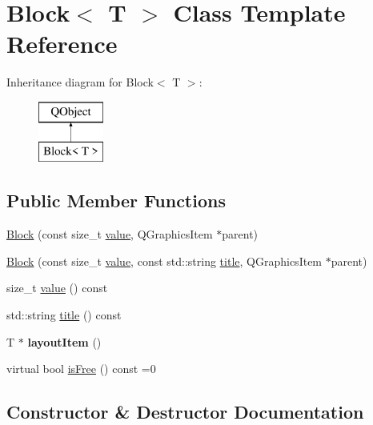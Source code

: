 \hypertarget{class_block}{}\section{Block$<$ T $>$ Class Template Reference}
\label{class_block}
Inheritance diagram for Block$<$ T $>$\+:\begin{figure}[H]
\begin{center}
\leavevmode
\includegraphics[height=2.000000cm]{class_block}
\end{center}
\end{figure}
\subsection*{Public Member Functions}
\begin{DoxyCompactItemize}
\item 
\mbox{\hyperlink{class_block_aa19ca9a93a3cb69f9583c1f5edfd5d26}{Block}} (const size\+\_\+t \mbox{\hyperlink{class_block_ab0b547f273f8d5e4e783ccedaf13ef26}{value}}, Q\+Graphics\+Item $\ast$parent)
\item 
\mbox{\hyperlink{class_block_a91743e5381dcc23971f99db3f1b7607c}{Block}} (const size\+\_\+t \mbox{\hyperlink{class_block_ab0b547f273f8d5e4e783ccedaf13ef26}{value}}, const std\+::string \mbox{\hyperlink{class_block_a48197972162fbfe6b2f4d721d80034cf}{title}}, Q\+Graphics\+Item $\ast$parent)
\item 
size\+\_\+t \mbox{\hyperlink{class_block_ab0b547f273f8d5e4e783ccedaf13ef26}{value}} () const
\item 
std\+::string \mbox{\hyperlink{class_block_a48197972162fbfe6b2f4d721d80034cf}{title}} () const
\item 
\mbox{\label{class_block_adebc177a35bfd2ecaebd8fc23a6ceafb}} 
T $\ast$ {\bfseries layout\+Item} ()
\item 
virtual bool \mbox{\hyperlink{class_block_a795e0536746b840286cb1e74487311a9}{is\+Free}} () const =0
\end{DoxyCompactItemize}


\subsection{Constructor \& Destructor Documentation}
\mbox{\label{class_block_aa19ca9a93a3cb69f9583c1f5edfd5d26}} 
